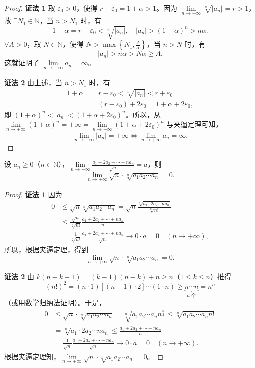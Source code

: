 \begin{proof}
\textbf{证法 1} 取 $\varepsilon_{0}>0$，使得 $r-\varepsilon_{0} = 1+\alpha > 1$。因为 $\lim\limits_{n\to+\infty}\sqrt[n]{|a_{n}|} = r > 1$，故 $\exists N_{1}\in\mathbb{N}$，当 $n>N_{1}$ 时，有
\[
1+\alpha = r-\varepsilon_{0} < \sqrt[n]{|a_{n}|},\quad |a_{n}| > (1+\alpha)^{n} > n\alpha.
\]
$\forall A>0$，取 $N\in\mathbb{N}$，使得 $N > \max\left\{N_{1}, \frac{A}{\alpha}\right\}$，当 $n>N$ 时，有
\[
|a_{n}| > n\alpha > N\alpha \geqslant A.
\]
这就证明了 $\lim\limits_{n\to+\infty}a_n=\infty$。

\textbf{证法 2} 由上述，当 $n > N_{1}$ 时，有
\begin{align*}
1+\alpha &= r-\varepsilon_{0} < \sqrt[n]{|a_{n}|} < r+\varepsilon_{0} \\
&= (r-\varepsilon_{0})+2\varepsilon_{0} = 1+\alpha+2\varepsilon_{0},
\end{align*}
即 $(1+\alpha)^{n} < |a_{n}| < (1+\alpha+2\varepsilon_{0})^{n}$。所以，从 $\lim\limits_{n\to+\infty}(1+\alpha)^n = +\infty = \lim\limits_{n\to+\infty}(1+\alpha+2\varepsilon_0)^n$ 与夹逼定理可知，
\[
\lim_{n\to+\infty}|a_{n}|=+\infty \iff \lim_{n\to+\infty}a_{n}=\infty.
\]
\end{proof}

\begin{example}\label{ex:1.2.8}
设 $a_{n} \geqslant 0$（$n \in \mathbb{N}$），$\lim\limits_{n \to +\infty} \frac{a_{1} + 2a_{2} + \cdots + na_{n}}{\sqrt{n}} = a$，则
\[
\lim_{n\to+\infty}\sqrt{n} \cdot \sqrt[n]{a_{1}a_{2}\cdots a_{n}} = 0.
\]
\end{example}

\begin{proof}
\textbf{证法 1} 因为
\begin{align*}
0 &\leqslant \sqrt{n}\sqrt[n]{a_{1}a_{2}\cdots a_{n}} = \sqrt{n}\frac{\sqrt[n]{a_1 \cdot 2a_2 \cdots na_n}}{\sqrt[n]{n!}} \\
&\leqslant \frac{\sqrt{n}}{\sqrt[n]{n!}}\frac{a_{1}+2a_{2}+\cdots+na_{n}}{n} \\
&= \frac{1}{\sqrt[n]{n!}}\frac{a_{1}+2a_{2}+\cdots+na_{n}}{\sqrt{n}} \to 0 \cdot a = 0\quad (n\to+\infty),
\end{align*}
所以，根据夹逼定理，得到
\[
\lim_{n\to+\infty}\sqrt{n} \cdot \sqrt[n]{a_{1}a_{2}\cdots a_{n}} = 0.
\]

\textbf{证法 2} 由 $k(n-k+1)=(k-1)(n-k)+n \geqslant n$（$1 \leqslant k \leqslant n$）推得
\[
(n!)^{2} = (n\cdot 1)[(n-1)\cdot 2]\cdots(1\cdot n) \geqslant \underbrace{n \cdots n}_{n\text{ 个}} = n^{n}
\]
（或用数学归纳法证明）。于是，
\begin{align*}
0 &\leqslant \sqrt{n} \cdot \sqrt[n]{a_{1}a_{2}\cdots a_{n}} = \sqrt[n]{a_{1}a_{2}\cdots a_{n}n^{\frac{n}{2}}} \leqslant \sqrt[n]{a_{1}a_{2}\cdots a_{n}n!} \\
&= \sqrt[n]{a_{1}\cdot 2a_{2}\cdots na_{n}} \leqslant \frac{a_{1}+2a_{2}+\cdots+na_{n}}{n} \\
&= \frac{1}{\sqrt{n}}\frac{a_{1}+2a_{2}+\cdots+na_{n}}{\sqrt{n}} \to 0 \cdot a = 0\quad (n\to+\infty).
\end{align*}
根据夹逼定理知，$\lim\limits_{n\to+\infty}\sqrt{n}\cdot\sqrt[n]{a_1a_2\cdots a_n}=0$。
\end{proof}

